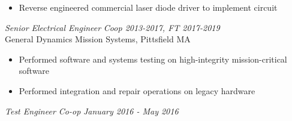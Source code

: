 \documentclass[line,mmmargin]{res}
\begin{document}
\begin{resume}
\begin{itemize}
		\item Reverse engineered commercial laser diode driver to
			implement circuit
	\end{itemize}
	\vspace{-10pt}
    {\sl Senior Electrical Engineer } \hfill
{\sl Coop 2013-2017, FT 2017-2019}\\
	General Dynamics Mission Systems, Pittsfield MA
	\begin{itemize}  \itemsep -2pt %
		\item Performed software and systems testing on high-integrity mission-critical software
		\item Performed integration and repair operations on legacy hardware
	\end{itemize}
	\vspace{-10pt}
{\sl  Test Engineer Co-op} \hfill {\sl January 2016 - May 2016}\\

\end{resume}
\end{document}
